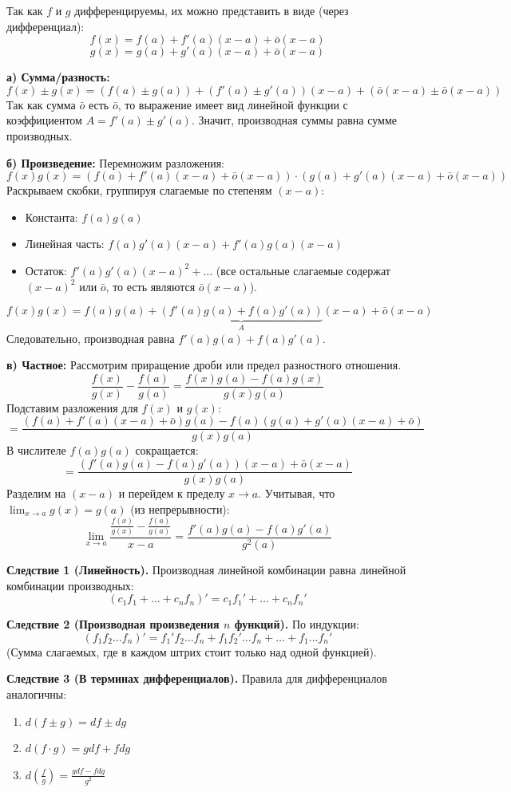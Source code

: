 \begin{tcolorbox}[title=Доказательство]
    Так как $f$ и $g$ дифференцируемы, их можно представить в виде (через дифференциал):
    \[ f(x) = f(a) + f'(a)(x-a) + \bar{o}(x-a) \]
    \[ g(x) = g(a) + g'(a)(x-a) + \bar{o}(x-a) \]
    
    \textbf{а) Сумма/разность:}
    \[ f(x) \pm g(x) = (f(a) \pm g(a)) + (f'(a) \pm g'(a))(x-a) + (\bar{o}(x-a) \pm \bar{o}(x-a)) \]
    Так как сумма $\bar{o}$ есть $\bar{o}$, то выражение имеет вид линейной функции с коэффициентом $A = f'(a) \pm g'(a)$.
    Значит, производная суммы равна сумме производных.
    
    \textbf{б) Произведение:}
    Перемножим разложения:
    \[ f(x)g(x) = \left( f(a) + f'(a)(x-a) + \bar{o}(x-a) \right) \cdot \left( g(a) + g'(a)(x-a) + \bar{o}(x-a) \right) \]
    Раскрываем скобки, группируя слагаемые по степеням $(x-a)$:
    \begin{itemize}
        \item Константа: $f(a)g(a)$
        \item Линейная часть: $f(a)g'(a)(x-a) + f'(a)g(a)(x-a)$
        \item Остаток: $f'(a)g'(a)(x-a)^2 + \dots$ (все остальные слагаемые содержат $(x-a)^2$ или $\bar{o}$, то есть являются $\bar{o}(x-a)$).
    \end{itemize}
    \[ f(x)g(x) = f(a)g(a) + \underbrace{(f'(a)g(a) + f(a)g'(a))}_{A}(x-a) + \bar{o}(x-a) \]
    Следовательно, производная равна $f'(a)g(a) + f(a)g'(a)$.
    
    \textbf{в) Частное:}
    Рассмотрим приращение дроби или предел разностного отношения.
    \[ \frac{f(x)}{g(x)} - \frac{f(a)}{g(a)} = \frac{f(x)g(a) - f(a)g(x)}{g(x)g(a)} \]
    Подставим разложения для $f(x)$ и $g(x)$:
    \[ = \frac{(f(a) + f'(a)(x-a) + \bar{o})g(a) - f(a)(g(a) + g'(a)(x-a) + \bar{o})}{g(x)g(a)} \]
    В числителе $f(a)g(a)$ сокращается:
    \[ = \frac{(f'(a)g(a) - f(a)g'(a))(x-a) + \bar{o}(x-a)}{g(x)g(a)} \]
    Разделим на $(x-a)$ и перейдем к пределу $x \to a$.
    Учитывая, что $\lim_{x\to a} g(x) = g(a)$ (из непрерывности):
    \[ \lim_{x\to a} \frac{\frac{f(x)}{g(x)} - \frac{f(a)}{g(a)}}{x-a} = \frac{f'(a)g(a) - f(a)g'(a)}{g^2(a)} \]
\end{tcolorbox}

\textbf{Следствие 1 (Линейность).}
Производная линейной комбинации равна линейной комбинации производных:
\[ (c_1 f_1 + \dots + c_n f_n)' = c_1 f_1' + \dots + c_n f_n' \]

\textbf{Следствие 2 (Производная произведения $n$ функций).}
По индукции:
\[ (f_1 f_2 \dots f_n)' = f_1' f_2 \dots f_n + f_1 f_2' \dots f_n + \dots + f_1 \dots f_n' \]
(Сумма слагаемых, где в каждом штрих стоит только над одной функцией).

\textbf{Следствие 3 (В терминах дифференциалов).}
Правила для дифференциалов аналогичны:
\begin{enumerate}
    \item[(а)] $d(f \pm g) = df \pm dg$
    \item[(б)] $d(f \cdot g) = g df + f dg$
    \item[(в)] $d\left(\frac{f}{g}\right) = \frac{g df - f dg}{g^2}$
\end{enumerate}
